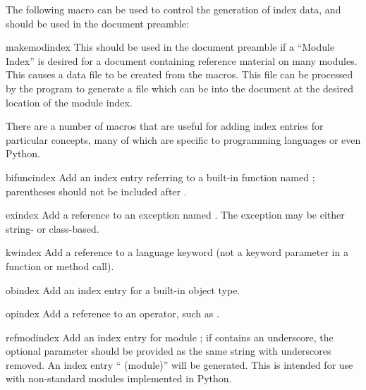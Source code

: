 \documentclass{howto}
\begin{document}
    The following macro can be used to control the generation of index
    data, and should be used in the document preamble:

    \begin{macrodesc}{makemodindex}{}
      This should be used in the document preamble if a ``Module
      Index'' is desired for a document containing reference material
      on many modules.  This causes a data file
       to be created from the
       macros.  This file can be processed by the
       program to generate a file which can be
       into the document at the desired location of the
      module index.
    \end{macrodesc}

    There are a number of macros that are useful for adding index
    entries for particular concepts, many of which are specific to
    programming languages or even Python.

    \begin{macrodesc}{bifuncindex}{}
      Add an index entry referring to a built-in function named
      ; parentheses should not be included after
      .
    \end{macrodesc}

    \begin{macrodesc}{exindex}{}
      Add a reference to an exception named .  The
      exception may be either string- or class-based.
    \end{macrodesc}

    \begin{macrodesc}{kwindex}{}
      Add a reference to a language keyword (not a keyword parameter
      in a function or method call).
    \end{macrodesc}

    \begin{macrodesc}{obindex}{}
      Add an index entry for a built-in object type.
    \end{macrodesc}

    \begin{macrodesc}{opindex}{}
      Add a reference to an operator, such as \samp{+}.
    \end{macrodesc}

    \begin{macrodesc}{refmodindex}{}
      Add an index entry for module ; if 
      contains an underscore, the optional parameter  should
      be provided as the same string with underscores removed.  An
      index entry `` (module)'' will be generated.  This
      is intended for use with non-standard modules implemented in
      Python.
    \end{macrodesc}
\end{document}
